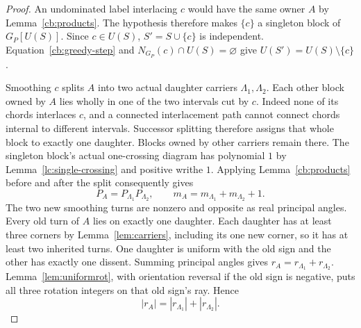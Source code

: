 \begin{proof}\leanok{}
An undominated label interlacing $c$ would have the same owner $A$ by
Lemma~\ref{cb:products}. The hypothesis therefore makes $\{c\}$ a
singleton block of $G_P[U(S)]$. Since $c\in U(S)$,
$S'=S\cup\{c\}$ is independent. Equation~\eqref{cb:greedy-step} and
$N_{G_P}(c)\cap U(S)=\varnothing$ give $U(S')=U(S)\setminus\{c\}$.

Smoothing $c$ splits $A$ into two actual daughter carriers
$\Lambda_1,\Lambda_2$. Each other block owned by $A$ lies wholly in
one of the two intervals cut by $c$. Indeed none of its chords
interlaces $c$, and a connected interlacement path cannot connect
chords internal to different intervals. Successor splitting therefore
assigns that whole block to exactly one daughter. Blocks owned by
other carriers remain there. The singleton block's actual one-crossing
diagram has polynomial $1$ by Lemma~\ref{lc:single-crossing} and
positive writhe $1$. Applying Lemma~\ref{cb:products} before and after
the split consequently gives
\begin{equation}\label{cb:singleton-products}
 P_A=P_{\Lambda_1}P_{\Lambda_2},\qquad
 m_A=m_{\Lambda_1}+m_{\Lambda_2}+1.
\end{equation}
The two new smoothing turns are nonzero and opposite as real principal
angles. Every old turn of $A$ lies on exactly one daughter. Each
daughter has at least three corners by Lemma~\ref{lem:carriers},
including its one new corner, so it has at least two inherited turns.
One daughter is uniform with the old sign and the other has exactly
one dissent. Summing principal angles gives
$r_A=r_{\Lambda_1}+r_{\Lambda_2}$. Lemma~\ref{lem:uniformrot}, with
orientation reversal if the old sign is negative, puts all three
rotation integers on that old sign's ray. Hence
\begin{equation}\label{cb:singleton-rotations}
 |r_A|=|r_{\Lambda_1}|+|r_{\Lambda_2}|.
\end{equation}


\end{proof}
